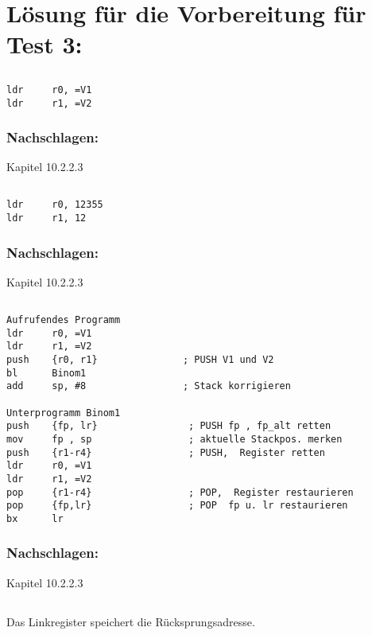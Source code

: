 \section{Lösung für die Vorbereitung für Test 3:}
\subsection{}
\begin{lstlisting}
ldr		r0, =V1 	
ldr	 	r1, =V2 
\end{lstlisting}

\subsubsection{Nachschlagen:}
Kapitel 10.2.2.3

\subsection{}
\begin{lstlisting}
ldr		r0, 12355  	
ldr	 	r1, 12  
\end{lstlisting}

\subsubsection{Nachschlagen:}
Kapitel 10.2.2.3

\subsection{}
\begin{lstlisting}
Aufrufendes Programm
ldr		r0, =V1 	
ldr	 	r1, =V2 	 
push 	{r0, r1}               ; PUSH V1 und V2 
bl      Binom1  
add 	sp, #8                 ; Stack korrigieren

Unterprogramm Binom1  
push   	{fp, lr} 				; PUSH fp , fp_alt retten 
mov 	fp , sp 				; aktuelle Stackpos. merken 
push   	{r1-r4}          		; PUSH,  Register retten 
ldr		r0, =V1 	
ldr	 	r1, =V2                                
pop 	{r1-r4}         		; POP,  Register restaurieren 
pop 	{fp,lr} 				; POP  fp u. lr restaurieren 
bx 		lr
\end{lstlisting}

\subsubsection{Nachschlagen:}
Kapitel 10.2.2.3

\subsection{}
Das Linkregister speichert die Rücksprungsadresse.

